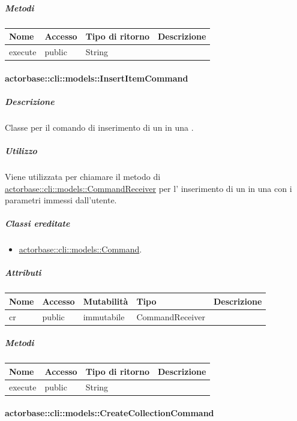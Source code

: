 \documentclass{scalatekids-article}
\begin{document}
\subparagraph{Metodi}

\begin{tabular}{| l | l | l | l |}
	\hline
	Nome & Accesso & Tipo di ritorno & Descrizione\\
	\hline
	execute & public & String & \\
	\hline
\end{tabular}

\paragraph{actorbase::cli::models::InsertItemCommand}
\label{sec:actorbase::cli::models::InsertItemCommand}

\subparagraph{Descrizione}

Classe per il comando di inserimento di un  in una
.

\subparagraph{Utilizzo}

Viene utilizzata per chiamare il metodo di \hyperref[sec:actorbase::cli::models::CommandReceiver]{actorbase::cli::models::CommandReceiver} per l' inserimento di un  in una  con i parametri immessi dall'utente.

\subparagraph{Classi ereditate}

\begin{itemize}
\item \hyperref[sec:actorbase::cli::models::Command]{actorbase::cli::models::Command}.
\end{itemize}

\subparagraph{Attributi}

\begin{tabular}{| l | l | l | l | l |}
	\hline
	Nome & Accesso & Mutabilità & Tipo & Descrizione\\
	\hline
	cr & public & immutabile & CommandReceiver & \\
	\hline
\end{tabular}

\subparagraph{Metodi}

\begin{tabular}{| l | l | l | l |}
	\hline
	Nome & Accesso & Tipo di ritorno & Descrizione\\
	\hline
	execute & public & String & \\
	\hline
\end{tabular}

\paragraph{actorbase::cli::models::CreateCollectionCommand}
\label{sec:actorbase::cli::models::CreateCollectionCommand}
\end{document}
